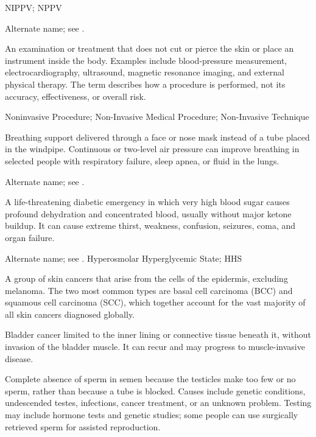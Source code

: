 \synonyms
NIPPV; NPPV

 Alternate name; see .

 An examination or treatment that does not cut or pierce the skin or place an instrument inside the body. Examples include blood-pressure measurement, electrocardiography, ultrasound, magnetic resonance imaging, and external physical therapy. The term describes how a procedure is performed, not its accuracy, effectiveness, or overall risk.

\synonyms
Noninvasive Procedure; Non-Invasive Medical Procedure; Non-Invasive Technique

 Breathing support delivered through a face or nose mask instead of a tube placed in the windpipe. Continuous or two-level air pressure can improve breathing in selected people with respiratory failure, sleep apnea, or fluid in the lungs.

 Alternate name; see .

 A life-threatening diabetic emergency in which very high blood sugar causes profound dehydration and concentrated blood, usually without major ketone buildup. It can cause extreme thirst, weakness, confusion, seizures, coma, and organ failure.

 Alternate name; see .
\synonyms
Hyperosmolar Hyperglycemic State; HHS

 A group of skin cancers that arise from the cells of the epidermis, excluding melanoma.
The two most common types are basal cell carcinoma (BCC) and squamous cell carcinoma
(SCC), which together account for the vast majority of all skin cancers diagnosed
globally.

 Bladder cancer limited to the inner lining or connective tissue beneath it, without invasion of the bladder muscle. It can recur and may progress to muscle-invasive disease.

 Complete absence of sperm in semen because the testicles make too few or no sperm, rather than because a tube is blocked. Causes include genetic conditions, undescended testes, infections, cancer treatment, or an unknown problem. Testing may include hormone tests and genetic studies; some people can use surgically retrieved sperm for assisted reproduction.

